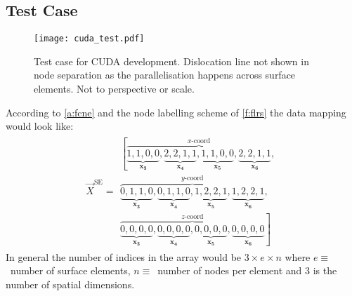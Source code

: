 	\subsection{Test Case}
	\begin{figure}
		\texttt{[image: cuda\_test.pdf]}
		\caption[Test case for CUDA development.]{Test case for CUDA development. Dislocation line not shown in node separation as the parallelisation happens across surface elements. Not to perspective or scale.}
		\label{f:cuda_test}
	\end{figure}
	According to \cref{a:fcne} and the node labelling scheme of \cref{f:flrs} the data mapping would look like:
	\begin{align}\label{e:cuda_test}
		\vec{X}^{\textrm{SE}} = 
		\begin{split}
			\left[\overbrace{\underbrace{1,1,0,0}_{\mathbf{x_{3}}}, \underbrace{2,2,1,1}_{\mathbf{x_{4}}},
				\underbrace{1,1,0,0}_{\mathbf{x_{5}}}, \underbrace{2,2,1,1}_{\mathbf{x_{6}}}}^{x\textrm{-coord}},\right.\\
			\overbrace{\underbrace{0,1,1,0}_{\mathbf{x_{3}}}, \underbrace{0,1,1,0}_{\mathbf{x_{4}}},
				\underbrace{1,2,2,1}_{\mathbf{x_{5}}}, \underbrace{1,2,2,1}_{\mathbf{x_{6}}}}^{y\textrm{-coord}},\\
			\left.\overbrace{\underbrace{0,0,0,0}_{\mathbf{x_{3}}}, \underbrace{0,0,0,0}_{\mathbf{x_{4}}},
				\underbrace{0,0,0,0}_{\mathbf{x_{5}}}, \underbrace{0,0,0,0}_{\mathbf{x_{6}}}}^{z\textrm{-coord}}\right]
		\end{split}
	\end{align}
	In general the number of indices in the array would be $ 3 \times e \times n $ where $ e \equiv $~number of surface elements, $ n \equiv $~number of nodes per element and 3 is the number of spatial dimensions.
	\savearabiccounter